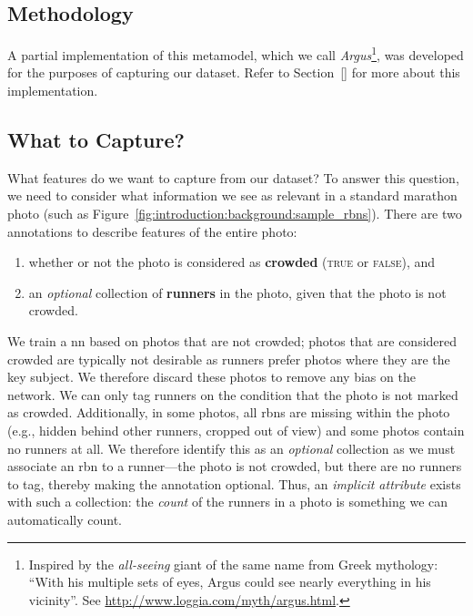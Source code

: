 \subsection{Methodology}
\label{sec:dataset:architecture:methodology}

A partial implementation of this metamodel, which we call \textit{Argus}\footnote{Inspired by the \textit{all-seeing} giant of the same name from Greek mythology: ``With his multiple sets of eyes, Argus could see nearly everything in his vicinity''. See \url{http://www.loggia.com/myth/argus.html}.}, was developed for the purposes of capturing our dataset. Refer to Section~\ref{} for more about this implementation.


\subsection{What to Capture?}
\label{sec:dataset:architecture:what_to_capture}

What features do we want to capture from our dataset? To answer this question, we need to consider what information we see as relevant in a standard marathon photo (such as Figure~\ref{fig:introduction:background:sample_rbns}). There are two annotations to describe features of the entire photo:

\begin{enumerate}
  \item whether or not the photo is considered as \textbf{crowded} (\textsc{true} or \textsc{false}), and
  \item an \textit{optional} collection of \textbf{runners} in the photo, given that the photo is not crowded.
\end{enumerate}


We train a \gls{nn} based on photos that are not crowded; photos that are considered crowded are typically not desirable as runners prefer photos where they are the key subject. We therefore discard these photos to remove any bias on the network. We can only tag runners on the condition that the photo is not marked as  crowded. Additionally, in some photos, all \glspl{rbn} are missing within the photo (e.g., hidden behind other runners, cropped out of view) and some photos contain no runners at all. We therefore identify this as an \textit{optional} collection as we must associate an \gls{rbn} to a runner---the photo is not crowded, but there are no runners to tag, thereby making the annotation optional. Thus, an \textit{implicit attribute} exists with such a collection: the \textit{count} of the runners in a photo is something we can automatically count.

